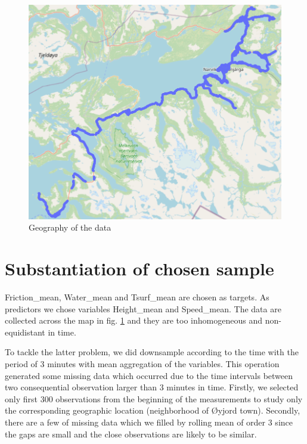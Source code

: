 \documentclass[12pt, bachelor, substylefile = algo_title.rtx]{disser}
\theoremstyle{definition}
\begin{document}
\begin{figure}[!h]
\centering
   \begin{minipage}{0.7\textwidth}
     \includegraphics[width=\linewidth]{geography}
   \end{minipage}
\caption{Geography of the data}
\label{fig: }
\end{figure}

\section{Substantiation of chosen sample}
Friction\_mean, Water\_mean and Tsurf\_mean are chosen as targets. As predictors we chose variables Height\_mean and Speed\_mean. The data are collected across the map in fig. \ref{fig: } and they are too inhomogeneous and non-equidistant in time. 

To tackle the latter problem, we did downsample according to the time with the period of $3$ minutes with mean aggregation of the variables. This operation generated some missing data which occurred due to the time intervals between two consequential observation larger than $3$ minutes in time. Firstly, we selected only first 300 observations from the beginning of the measurements to study only the corresponding geographic location (neighborhood of Øyjord town). Secondly, there are a few of missing data which we filled by rolling mean of order 3 since the gaps are small and the close observations are likely to be similar.
\end{document}
